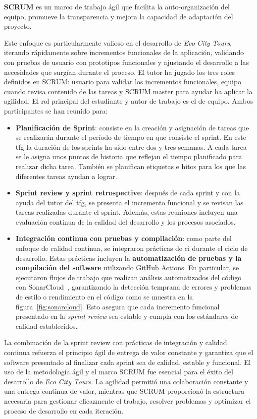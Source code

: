 \textbf{SCRUM} es un marco de trabajo ágil que facilita la auto-organización del equipo, promueve la transparencia y mejora la capacidad de adaptación del proyecto.

Este enfoque es particularmente valioso en el desarrollo de \textit{Eco City Tours}, iterando rápidamente sobre incrementos funcionales de la aplicación, validando con pruebas de usuario con prototipos funcionales y ajustando el desarrollo a las necesidades que surgían durante el proceso. El tutor ha jugado los tres roles definidos en SCRUM: usuario para validar los incrementos funcionales, equipo cuando revisa contenido de las tareas y SCRUM master para ayudar ha aplicar la agilidad. El rol principal del estudiante y autor de trabajo es el de equipo. Ambos participantes se han reunido para:
\begin{itemize}
	\item \textbf{Planificación de Sprint}: consiste en la creación y asignación de tareas que se realizarán durante el período de tiempo en que consiste el sprint. En este \acrshort{tfg} la duración de los sprints ha sido entre dos y tres semanas. A cada tarea se le asigna unos puntos de historia que reflejan el tiempo planificado para realizar dicha tarea. También se planifican etiquetas e hitos para los que las diferentes tareas ayudan a lograr.
	\item \textbf{Sprint review y sprint retrospective}: después de cada sprint y con la ayuda del tutor del \acrshort{tfg}, se presenta el incremento funcional y se revisan las tareas realizadas durante el sprint. Además, estas reuniones incluyen una evaluación continua de la calidad del desarrollo y los procesos asociados.
	\item \textbf{Integración continua con pruebas y compilación}: como parte del enfoque de calidad continua, se integraron prácticas de \acrfull{ci} durante el ciclo de desarrollo. Estas prácticas incluyen la \textbf{automatización de pruebas y la compilación del software} utilizando GitHub Actions. En particular, se ejecutaron flujos de trabajo que realizan análisis automatizados del código con SonarCloud~\cite{sonarcloud}, garantizando la detección temprana de errores y problemas de estilo o rendimiento en el código como se muestra en la figura~\ref{fig:sonarcloud}. Esto asegura que cada incremento funcional presentado en la \textit{sprint review} sea estable y cumpla con los estándares de calidad establecidos.
	\end{itemize}
La combinación de la sprint review con prácticas de integración y calidad continua refuerza el principio ágil de entrega de valor constante y garantiza que el software presentado al finalizar cada sprint sea de calidad, estable y funcional. El uso de la metodología ágil y el marco SCRUM fue esencial para el éxito del desarrollo de \textit{Eco City Tours}. La agilidad permitió una colaboración constante y una entrega continua de valor, mientras que SCRUM proporcionó la estructura necesaria para gestionar eficazmente el trabajo, resolver problemas y optimizar el proceso de desarrollo en cada iteración.
